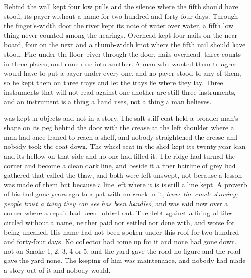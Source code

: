 Behind the wall  kept four low pulls and the silence where the fifth should have stood, its payer without a name for two hundred and forty-four days. Through the finger's-width door the river kept its note of water over water, a fifth low thing never counted among the hearings. Overhead  kept four nails on the near board, four on the next and a thumb-width knot where the fifth nail should have stood. Fire under the floor, river through the door, nails overhead: three counts in three places, and none rose into another. A man who wanted them to agree would have to put a payer under every one, and no payer stood to any of them, so he kept them on three trays and let the trays lie where they lay. Three instruments that will not read against one another are still three instruments, and an instrument is a thing a hand uses, not a thing a man believes.

 was kept in objects and not in a story. The salt-stiff coat held a broader man's shape on its peg behind the door with the crease at the left shoulder where a man had once leaned to reach a shelf, and nobody straightened the crease and nobody took the coat down. The wheel-seat in the shed kept its twenty-year lean and its hollow on that side and no one had filled it. The  ridge had turned the corner and become a clean dark line, and beside it a finer hairline of grey had gathered that  called the thaw, and both were left unswept, not because a lesson was made of them but because a line left where it is is still a line kept. A proverb of his had gone years ago to a pot with no crack in it, \emph{leave the crack showing; people trust a thing they can see has been handled}, and was said now over a corner where a repair had been rubbed out. The debt against a firing of tiles circled without a name, neither paid nor settled nor done with, and worse for being uncalled. His name had not been spoken under this roof for two hundred and forty-four days. No collector had come up  for it and none had gone down, not on Smoke 1, 2, 3, 4 or 5, and the yard gave the road no figure and the road gave the yard none. The keeping of him was maintenance, and nobody had made a story out of it and nobody would.

\scenebreak

